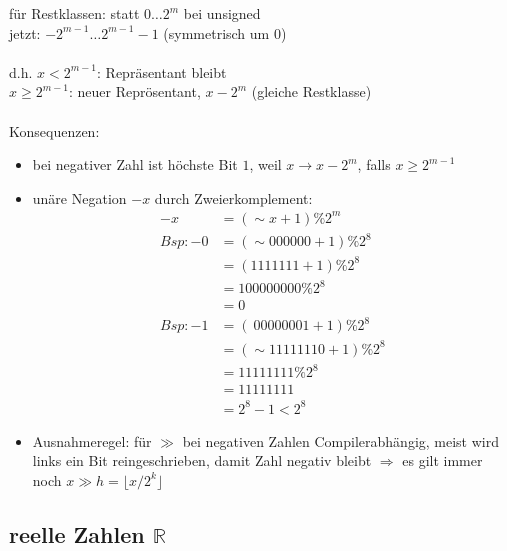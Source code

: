 \documentclass{article}
\begin{document}
	für Restklassen: statt $0 \dots 2^m $ bei unsigned \\
	jetzt: $-2^{m-1} \dots 2^{m-1}-1 $ (symmetrisch um 0) \\ \\
	d.h. $x<2^{m-1} $: Repräsentant bleibt \\
	$x \geq 2^{m-1} $: neuer Reprösentant, $x-2^m $ (gleiche Restklasse) \\ \\ Konsequenzen:

	\begin{itemize}
		\item bei negativer Zahl ist höchste Bit $1$, weil $x \rightarrow x-2^m $, falls $x \geq 2^{m-1} $
		\item unäre Negation $-x$ durch Zweierkomplement:
		\begin{align*}
			-x & = (\sim x+1)\%2^m \\
			Bsp:  -0 & = (\sim 000000+1) \% 2^8 \\
			& = (1111111+1) \% 2^8 \\
			& = 100000000 \% 2^8 \\
			& = 0 \\
			Bsp:  -1 &= (~00000001 + 1) \% 2^8 \\ 
			&= (\sim 11111110 + 1) \% 2^8 \\
			& = 11111111 \% 2^8 \\
			& = 11111111 \\
			& = 2^8-1 < 2^8 
		\end{align*}

		\item Ausnahmeregel: für $\gg$ bei negativen Zahlen Compilerabhängig, meist wird links ein Bit reingeschrieben, damit Zahl negativ bleibt $\Rightarrow$ es gilt immer noch $x \gg h = \lfloor x/2^k\rfloor$
	\end{itemize}

\subsection{reelle Zahlen $\mathbb{R}$}
\end{document}
